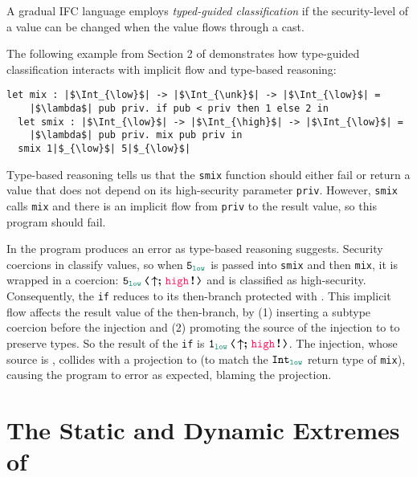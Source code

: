 A gradual IFC language employs \textit{typed-guided classification} if the
security-level of a value can be changed when the value flows through a cast.

The following example from Section 2 of \textcite{Toro:2018aa} demonstrates how
type-guided classification interacts with implicit flow and type-based
reasoning:
\begin{lstlisting}[style=tt]
  let mix : |$\Int_{\low}$| -> |$\Int_{\unk}$| -> |$\Int_{\low}$| =
    |$\lambda$| pub priv. if pub < priv then 1 else 2 in
  let smix : |$\Int_{\low}$| -> |$\Int_{\high}$| -> |$\Int_{\low}$| =
    |$\lambda$| pub priv. mix pub priv in
  smix 1|$_{\low}$| 5|$_{\low}$|
\end{lstlisting}

\noindent Type-based reasoning tells us that the \texttt{smix} function should
either fail or return a value that does not depend on its high-security
parameter \texttt{priv}. However, \texttt{smix} calls \texttt{mix} and there is
an implicit flow from \texttt{priv} to the result value, so this program should
fail.

In \Surface the program produces an error as type-based reasoning suggests.
Security coercions in \CC classify values, so when $\key{5}_{\low}$ is passed
into \texttt{smix} and then \texttt{mix}, it is wrapped in a coercion:
$\cccast{\key{5}_{\low}}{\up\seq\inj{\high}}$ and is classified as
high-security.
%
Consequently, the \texttt{if} reduces to its then-branch protected with \high.
This implicit flow affects the result value of the then-branch, by (1) inserting
a subtype coercion before the injection and (2) promoting the source of the
injection to \high to preserve types. So the result of the \texttt{if} is
$\cccast{\key{1}_{\low}}{\up\seq\inj{\high}}$. The injection, whose source is
\high, collides with a projection to \low (to match the $\Int_{\low}$ return
type of \texttt{mix}), causing the program to error as expected, blaming the
projection.

\section{The Static and Dynamic Extremes of \Surface}
\label{sec:embedding}

